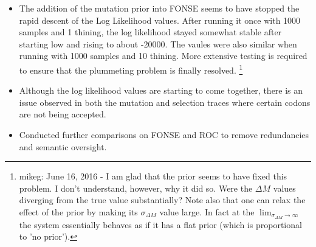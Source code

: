 \documentclass[11pt]{labbook}
\newcommand{\DeltaM}{\ensuremath{\Delta M}\xspace}
\begin{document}
\begin{itemize}
    \item The addition of the mutation prior into FONSE seems to have stopped the rapid descent of the Log Likelihood values. After running it once with 1000 samples and 1 thining, the log likelihood stayed somewhat stable after starting low and rising to about -20000. The vaules were also similar when running with 1000 samples and 10 thining. More extensive testing is required to ensure that the plummeting problem is finally resolved.
      \footnote{mikeg: June 16, 2016 -
        I am glad that the prior seems to have fixed this problem.  
        I don't understand, however, why it did so.  
        Were the \DeltaM values diverging from the true value substantially?
        Note also that one can relax the effect of the prior by making its $\sigma_\DeltaM$ value large. 
        In fact at the $\lim_{\sigma_\DeltaM \rightarrow \infty}$ the system essentially behaves as if it has a flat prior (which is proportional to 'no prior').
}
        
    \item Although the log likelihood values are starting to come together, there is an issue observed in both the mutation and selection traces where certain codons are not being accepted. 
    \item Conducted further comparisons on FONSE and ROC to remove redundancies and semantic oversight.
\end{itemize}

\end{document}

